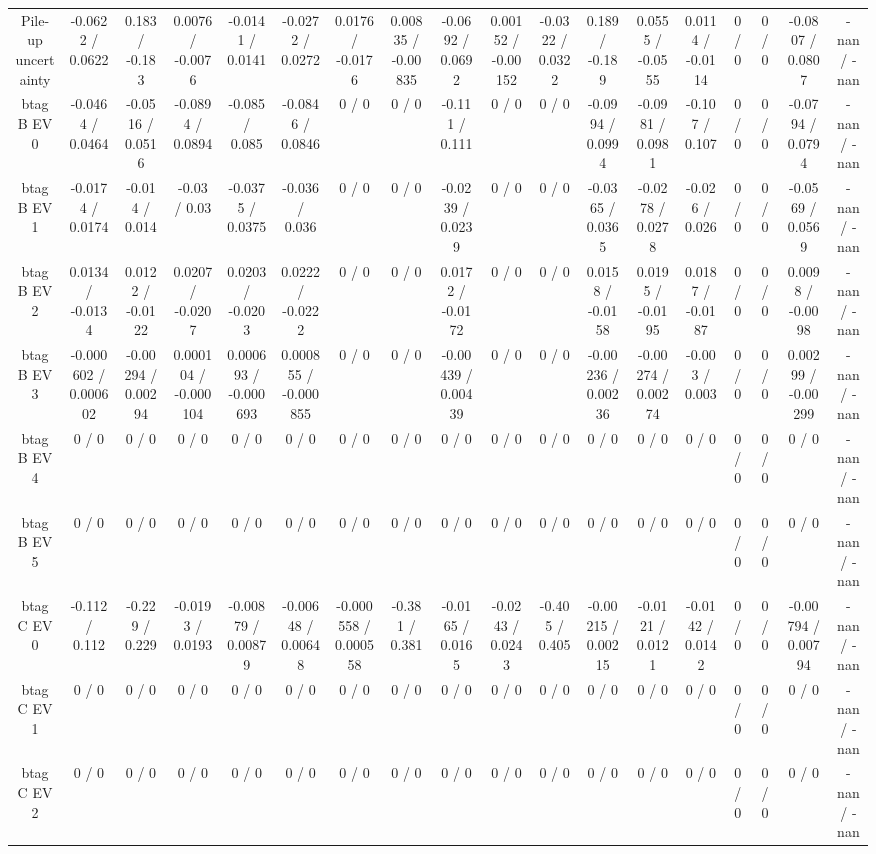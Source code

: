 \documentclass[10pt]{article}
\begin{document}
\begin{table}[htbp]
\begin{center}
\begin{tabular}{|c|c|c|c|c|c|c|c|c|c|c|c|c|c|c|c|c|c|}
  Pile-up uncertainty & -0.0622 / 0.0622 & 0.183 / -0.183 & 0.0076 / -0.0076 & -0.0141 / 0.0141 & -0.0272 / 0.0272 & 0.0176 / -0.0176 & 0.00835 / -0.00835 & -0.0692 / 0.0692 & 0.00152 / -0.00152 & -0.0322 / 0.0322 & 0.189 / -0.189 & 0.0555 / -0.0555 & 0.0114 / -0.0114 & 0 / 0 & 0 / 0 & -0.0807 / 0.0807 & -nan / -nan \\ 
  btag B EV 0 & -0.0464 / 0.0464 & -0.0516 / 0.0516 & -0.0894 / 0.0894 & -0.085 / 0.085 & -0.0846 / 0.0846 & 0 / 0 & 0 / 0 & -0.111 / 0.111 & 0 / 0 & 0 / 0 & -0.0994 / 0.0994 & -0.0981 / 0.0981 & -0.107 / 0.107 & 0 / 0 & 0 / 0 & -0.0794 / 0.0794 & -nan / -nan \\ 
  btag B EV 1 & -0.0174 / 0.0174 & -0.014 / 0.014 & -0.03 / 0.03 & -0.0375 / 0.0375 & -0.036 / 0.036 & 0 / 0 & 0 / 0 & -0.0239 / 0.0239 & 0 / 0 & 0 / 0 & -0.0365 / 0.0365 & -0.0278 / 0.0278 & -0.026 / 0.026 & 0 / 0 & 0 / 0 & -0.0569 / 0.0569 & -nan / -nan \\ 
  btag B EV 2 & 0.0134 / -0.0134 & 0.0122 / -0.0122 & 0.0207 / -0.0207 & 0.0203 / -0.0203 & 0.0222 / -0.0222 & 0 / 0 & 0 / 0 & 0.0172 / -0.0172 & 0 / 0 & 0 / 0 & 0.0158 / -0.0158 & 0.0195 / -0.0195 & 0.0187 / -0.0187 & 0 / 0 & 0 / 0 & 0.0098 / -0.0098 & -nan / -nan \\ 
  btag B EV 3 & -0.000602 / 0.000602 & -0.00294 / 0.00294 & 0.000104 / -0.000104 & 0.000693 / -0.000693 & 0.000855 / -0.000855 & 0 / 0 & 0 / 0 & -0.00439 / 0.00439 & 0 / 0 & 0 / 0 & -0.00236 / 0.00236 & -0.00274 / 0.00274 & -0.003 / 0.003 & 0 / 0 & 0 / 0 & 0.00299 / -0.00299 & -nan / -nan \\ 
  btag B EV 4 & 0 / 0 & 0 / 0 & 0 / 0 & 0 / 0 & 0 / 0 & 0 / 0 & 0 / 0 & 0 / 0 & 0 / 0 & 0 / 0 & 0 / 0 & 0 / 0 & 0 / 0 & 0 / 0 & 0 / 0 & 0 / 0 & -nan / -nan \\ 
  btag B EV 5 & 0 / 0 & 0 / 0 & 0 / 0 & 0 / 0 & 0 / 0 & 0 / 0 & 0 / 0 & 0 / 0 & 0 / 0 & 0 / 0 & 0 / 0 & 0 / 0 & 0 / 0 & 0 / 0 & 0 / 0 & 0 / 0 & -nan / -nan \\ 
  btag C EV 0 & -0.112 / 0.112 & -0.229 / 0.229 & -0.0193 / 0.0193 & -0.00879 / 0.00879 & -0.00648 / 0.00648 & -0.000558 / 0.000558 & -0.381 / 0.381 & -0.0165 / 0.0165 & -0.0243 / 0.0243 & -0.405 / 0.405 & -0.00215 / 0.00215 & -0.0121 / 0.0121 & -0.0142 / 0.0142 & 0 / 0 & 0 / 0 & -0.00794 / 0.00794 & -nan / -nan \\ 
  btag C EV 1 & 0 / 0 & 0 / 0 & 0 / 0 & 0 / 0 & 0 / 0 & 0 / 0 & 0 / 0 & 0 / 0 & 0 / 0 & 0 / 0 & 0 / 0 & 0 / 0 & 0 / 0 & 0 / 0 & 0 / 0 & 0 / 0 & -nan / -nan \\ 
  btag C EV 2 & 0 / 0 & 0 / 0 & 0 / 0 & 0 / 0 & 0 / 0 & 0 / 0 & 0 / 0 & 0 / 0 & 0 / 0 & 0 / 0 & 0 / 0 & 0 / 0 & 0 / 0 & 0 / 0 & 0 / 0 & 0 / 0 & -nan / -nan \\ 

\end{tabular}
\end{center}
\end{table}
\end{document}
